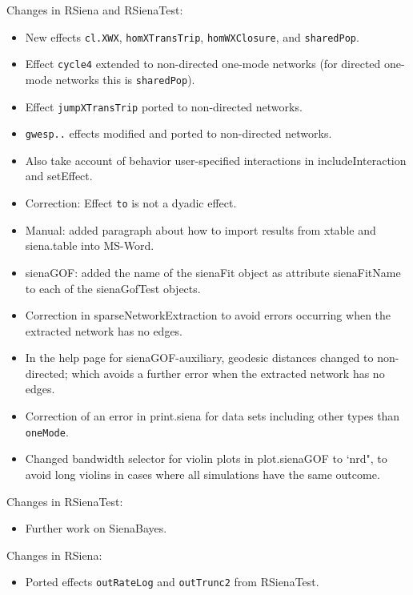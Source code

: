 \documentclass[a4paper,fleqn,11pt]{article}
\newcommand{\+}{\, + \,}
\newcommand{\sfn}[1]{\textsf{#1}}
\begin{document}
\begin{small}
\begin{itemize}
Changes in \textsf{RSiena} and \textsf{RSienaTest}:
\begin{itemize}
\item New effects \texttt{cl.XWX}, \texttt{homXTransTrip},
    \texttt{homWXClosure}, and \texttt{sharedPop}.
 \item Effect \texttt{cycle4} extended to non-directed one-mode networks
    (for directed one-mode networks this is \texttt{sharedPop}).
 \item Effect \texttt{jumpXTransTrip} ported to non-directed networks.
 \item \texttt{gwesp..}  effects modified and ported to non-directed networks.
 \item Also take account of behavior user-specified interactions in
     \sfn{includeInteraction} and \textsf{setEffect}.
 \item Correction: Effect \texttt{to} is not a dyadic effect.
 \item Manual: added paragraph about how to import results from
     \sfn{xtable} and \sfn{siena.table} into MS-Word.
 \item \textsf{sienaGOF}: added the name of the \sfn{sienaFit} object
     as attribute \sfn{sienaFitName} to each of the \sfn{sienaGofTest} objects.
 \item Correction in \sfn{sparseNetworkExtraction} to avoid errors occurring
     when the extracted network has no edges.
 \item In the help page for \sfn{sienaGOF-auxiliary}, geodesic distances
     changed to non-directed; which avoids a further error
     when the extracted network has no edges.
 \item Correction of an error in \sfn{print.siena} for data sets including
     other types than \texttt{oneMode}.
 \item Changed bandwidth selector for violin plots in \sfn{plot.sienaGOF} to `nrd",
     to avoid long violins in cases where all simulations have the same outcome.
\end{itemize}

Changes in \textsf{RSienaTest}:
\begin{itemize}
\item Further work on \sfn{SienaBayes}.
\end{itemize}

Changes in RSiena:
\begin{itemize}
  \item Ported effects \texttt{outRateLog} and \texttt{outTrunc2} from \textsf{RSienaTest}.
\end{itemize}


\end{itemize}
\end{small}
\end{document}
